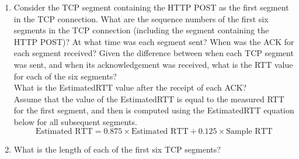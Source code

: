 \begin{enumerate}[label=\bfseries Problem \arabic*:,leftmargin=*,labelindent=1em]
        \soln
        \item Consider the TCP segment containing the HTTP POST as the first segment in the TCP connection. What are the sequence numbers of the first six segments in the TCP connection (including the segment containing the HTTP POST)? At what time was each segment sent? When was the ACK for each segment received? Given the difference between when each TCP segment was sent, and when its acknowledgement was received, what is the RTT value for each of the six segments? \\
        What is the EstimatedRTT value after the receipt of each ACK?\\
        Assume that the value of the EstimatedRTT is equal to the measured RTT for the first segment, and then is computed using the EstimatedRTT equation below for all subsequent segments.\\
        \begin{equation*}
            \text{Estimated RTT} = 0.875 \times \text{Estimated RTT} + 0.125 \times \text{Sample RTT}
        \end{equation*}
        \soln
        \item What is the length of each of the first six TCP segments?\\[0.2mm]
        \soln

\end{enumerate}
